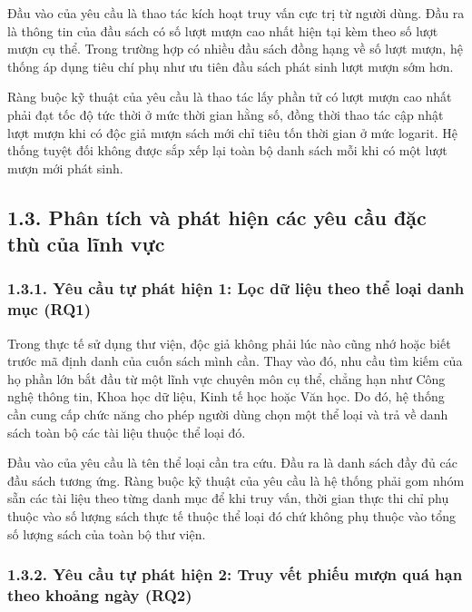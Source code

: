 \documentclass[14pt,a4paper]{extarticle}
\begin{document}
Đầu vào của yêu cầu là thao tác kích hoạt truy vấn cực trị từ người dùng. Đầu ra là thông tin của đầu sách có số lượt mượn cao nhất hiện tại kèm theo số lượt mượn cụ thể. Trong trường hợp có nhiều đầu sách đồng hạng về số lượt mượn, hệ thống áp dụng tiêu chí phụ như ưu tiên đầu sách phát sinh lượt mượn sớm hơn.

Ràng buộc kỹ thuật của yêu cầu là thao tác lấy phần tử có lượt mượn cao nhất phải đạt tốc độ tức thời ở mức thời gian hằng số, đồng thời thao tác cập nhật lượt mượn khi có độc giả mượn sách mới chỉ tiêu tốn thời gian ở mức logarit. Hệ thống tuyệt đối không được sắp xếp lại toàn bộ danh sách mỗi khi có một lượt mượn mới phát sinh.

\subsection*{1.3. Phân tích và phát hiện các yêu cầu đặc thù của lĩnh vực}

\subsubsection*{1.3.1. Yêu cầu tự phát hiện 1: Lọc dữ liệu theo thể loại danh mục (RQ1)}

Trong thực tế sử dụng thư viện, độc giả không phải lúc nào cũng nhớ hoặc biết trước mã định danh của cuốn sách mình cần. Thay vào đó, nhu cầu tìm kiếm của họ phần lớn bắt đầu từ một lĩnh vực chuyên môn cụ thể, chẳng hạn như Công nghệ thông tin, Khoa học dữ liệu, Kinh tế học hoặc Văn học. Do đó, hệ thống cần cung cấp chức năng cho phép người dùng chọn một thể loại và trả về danh sách toàn bộ các tài liệu thuộc thể loại đó.

Đầu vào của yêu cầu là tên thể loại cần tra cứu. Đầu ra là danh sách đầy đủ các đầu sách tương ứng. Ràng buộc kỹ thuật của yêu cầu là hệ thống phải gom nhóm sẵn các tài liệu theo từng danh mục để khi truy vấn, thời gian thực thi chỉ phụ thuộc vào số lượng sách thực tế thuộc thể loại đó chứ không phụ thuộc vào tổng số lượng sách của toàn bộ thư viện.

\subsubsection*{1.3.2. Yêu cầu tự phát hiện 2: Truy vết phiếu mượn quá hạn theo khoảng ngày (RQ2)}
\end{document}
